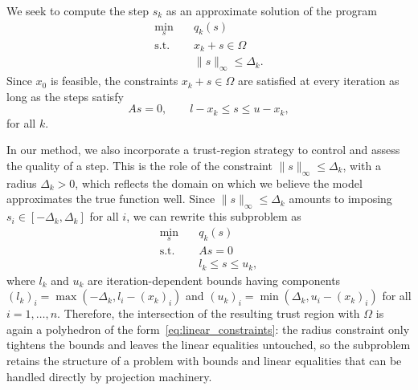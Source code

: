 \documentclass[pdflatex,sn-mathphys-num]{sn-jnl}%
\theoremstyle{thmstyleone}%
\begin{document}
We seek to compute the step $s_k$ as an approximate solution of the program
\begin{align*}
	\min_{s} \quad& q_k(s)  \\
	\text{s.t.}  \quad & x_k+s \in \Omega \\ 
	& \|s\|_\infty \le \Delta_k.
\end{align*}	
Since $x_0$ is feasible, the constraints $x_k+s\in \Omega$ are satisfied at every iteration as long as the steps satisfy
\[As = 0, \qquad l - x_k \le s \le u-x_k,\]
for all $k$.

In our method, we also incorporate a trust-region strategy to control and assess the quality of a step. This is the role of the constraint $\|s\|_\infty \le \Delta_k$, with a radius $\Delta_k > 0$, which reflects the domain on which we believe the model approximates the true function well. Since $\|s\|_\infty \le \Delta_k$ amounts to imposing $s_i \in [-\Delta_k,\Delta_k]$ for all $i$, we can rewrite this subproblem as
\begin{subequations}\label{pb:quadratic_subproblem} 
	\begin{align}
		\min_{s} \quad& q_k(s)  \\
		\text{s.t.}  \quad & As=0 \\
		& l_k \le s \le u_k,
	\end{align}	
\end{subequations}
where $l_k$ and $u_k$ are iteration-dependent bounds having components $(l_k)_i = \max\left(-\Delta_k,l_i-(x_k)_i\right)$ and $(u_k)_i = \min\left(\Delta_k,u_i-(x_k)_i\right)$ for all $i=1,\ldots,n$. Therefore, the intersection of the resulting trust region with $\Omega$ is again a polyhedron of the form~\eqref{eq:linear_constraints}: the radius constraint only tightens the bounds and leaves the linear equalities untouched, so the subproblem retains the structure of a problem with bounds and linear equalities that can be handled directly by projection machinery.
\end{document}

